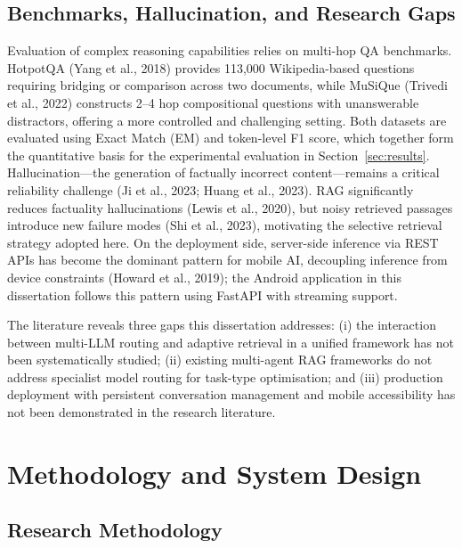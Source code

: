 \documentclass[12pt,a4paper]{article}
\begin{document}
\subsection{Benchmarks, Hallucination, and Research Gaps}
\label{subsec:benchmarks_gaps}

Evaluation of complex reasoning capabilities relies on multi-hop QA benchmarks. HotpotQA (Yang et al., 2018) provides 113,000 Wikipedia-based questions requiring bridging or comparison across two documents, while MuSiQue (Trivedi et al., 2022) constructs 2--4 hop compositional questions with unanswerable distractors, offering a more controlled and challenging setting. Both datasets are evaluated using Exact Match (EM) and token-level F1 score, which together form the quantitative basis for the experimental evaluation in Section~\ref{sec:results}. Hallucination---the generation of factually incorrect content---remains a critical reliability challenge (Ji et al., 2023; Huang et al., 2023). RAG significantly reduces factuality hallucinations (Lewis et al., 2020), but noisy retrieved passages introduce new failure modes (Shi et al., 2023), motivating the selective retrieval strategy adopted here. On the deployment side, server-side inference via REST APIs has become the dominant pattern for mobile AI, decoupling inference from device constraints (Howard et al., 2019); the Android application in this dissertation follows this pattern using FastAPI with streaming support.

The literature reveals three gaps this dissertation addresses: (i) the interaction between multi-LLM routing and adaptive retrieval in a unified framework has not been systematically studied; (ii) existing multi-agent RAG frameworks do not address specialist model routing for task-type optimisation; and (iii) production deployment with persistent conversation management and mobile accessibility has not been demonstrated in the research literature.

\newpage



\section{Methodology and System Design}
\label{sec:methodology}

\subsection{Research Methodology}
\label{subsec:research_methodology}
\end{document}
